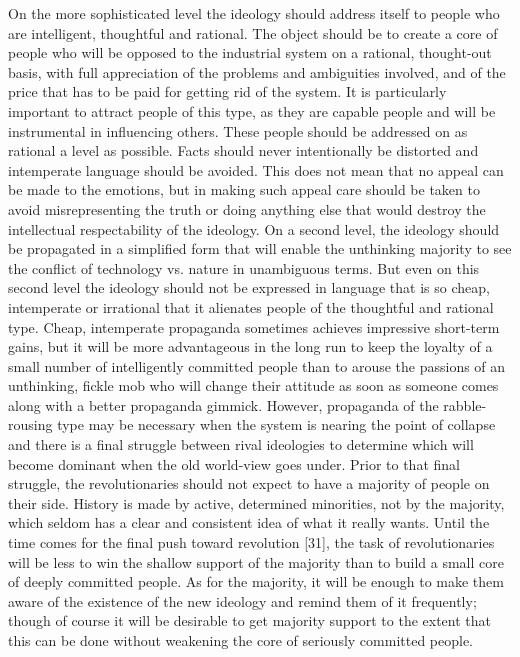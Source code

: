  On the more sophisticated level the ideology should address itself to people who are intelligent, thoughtful and rational. The object should be to create a core of people who will be opposed to the industrial system on a rational, thought-out basis, with full appreciation of the problems and ambiguities involved, and of the price that has to be paid for getting rid of the system. It is particularly important to attract people of this type, as they are capable people and will be instrumental in influencing others. These people should be addressed on as rational a level as possible. Facts should never intentionally be distorted and intemperate language should be avoided. This does not mean that no appeal can be made to the emotions, but in making such appeal care should be taken to avoid misrepresenting the truth or doing anything else that would destroy the intellectual respectability of the ideology.\break
{} On a second level, the ideology should be propagated in a simplified form that will enable the unthinking majority to see the conflict of technology vs. nature in unambiguous terms. But even on this second level the ideology should not be expressed in language that is so cheap, intemperate or irrational that it alienates people of the thoughtful and rational type. Cheap, intemperate propaganda sometimes achieves impressive short-term gains, but it will be more advantageous in the long run to keep the loyalty of a small number of intelligently committed people than to arouse the passions of an unthinking, fickle mob who will change their attitude as soon as someone comes along with a better propaganda gimmick. However, propaganda of the rabble-rousing type may be necessary when the system is nearing the point of collapse and there is a final struggle between rival ideologies to determine which will become dominant when the old world-view goes under.\break
{} Prior to that final struggle, the revolutionaries should not expect to have a majority of people on their side. History is made by active, determined minorities, not by the majority, which seldom has a clear and consistent idea of what it really wants. Until the time comes for the final push toward revolution [31], the task of revolutionaries will be less to win the shallow support of the majority than to build a small core of deeply committed people. As for the majority, it will be enough to make them aware of the existence of the new ideology and remind them of it frequently; though of course it will be desirable to get majority support to the extent that this can be done without weakening the core of seriously committed people.
